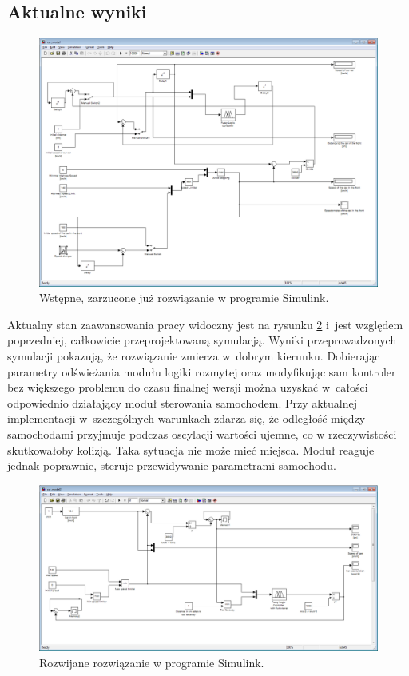 \documentclass[11pt,a4paper]{article}
\begin{document}
\subsection{Aktualne wyniki}
\begin{figure}
\includegraphics[width=\textwidth]{simulink1.png}
\caption{Wstępne, zarzucone już rozwiązanie w programie Simulink.} 
\label{img:simulink1}
\end{figure}

Aktualny stan zaawansowania pracy widoczny jest na rysunku \ref{img:simulink2} i~jest względem poprzedniej, całkowicie przeprojektowaną symulacją. Wyniki przeprowadzonych symulacji pokazują, że rozwiązanie zmierza w~dobrym kierunku. Dobierając parametry odświeżania modułu logiki rozmytej oraz modyfikując sam kontroler bez większego problemu do czasu finalnej wersji można uzyskać w~całości odpowiednio działający moduł sterowania samochodem. Przy aktualnej implementacji w~szczególnych warunkach zdarza się, że odległość między samochodami przyjmuje podczas oscylacji wartości ujemne, co w rzeczywistości skutkowałoby kolizją. Taka sytuacja nie może mieć miejsca. Moduł reaguje jednak poprawnie, steruje przewidywanie parametrami samochodu.

\begin{figure}
\includegraphics[width=\textwidth]{simulink2.png}
\caption{Rozwijane rozwiązanie w programie Simulink.} 
\label{img:simulink2}
\end{figure}
\end{document}
